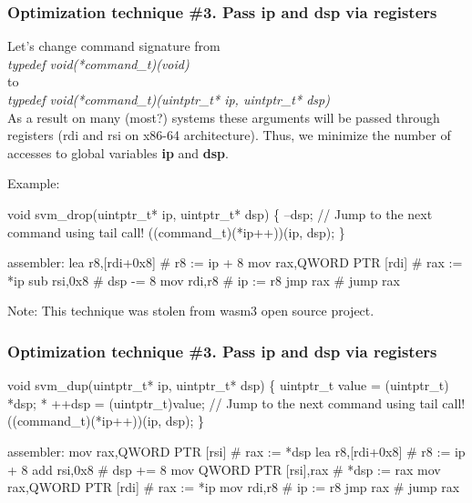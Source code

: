 \documentclass[hyperref={colorlinks=true},xcolor=table]{beamer}
\begin{document}
\tiny
\begin{frame}[fragile]
  \frametitle{Optimization technique \#3. Pass ip and dsp via
    registers}
  Let's change command signature from\\
  \textit{typedef void(*command\_t)(void)}\\
  to\\
  \textit{typedef void(*command\_t)(uintptr\_t* ip, uintptr\_t* dsp)}\\
  As a result on many (most?) systems these arguments will be passed
  through registers (rdi and rsi on x86-64 architecture). Thus, we
  minimize the number of accesses to global variables \textbf{ip} and \textbf{dsp}.

  Example:
  \begin{CodeNoLabel}
void svm_drop(uintptr_t* ip, uintptr_t* dsp) \{
    --dsp;
    // Jump to the next command using tail call!
    ((command_t)(*ip++))(ip, dsp);
\}

assembler:
    lea    r8,[rdi+0x8]           # r8  := ip + 8
    mov    rax,QWORD PTR [rdi]    # rax := *ip
    sub    rsi,0x8                # dsp -= 8
    mov    rdi,r8                 # ip  := r8
    jmp    rax                    # jump rax

  \end{CodeNoLabel}

  Note: This technique was stolen from wasm3 open source project.
\end{frame}
\normalsize

\begin{frame}[fragile]
  \frametitle{Optimization technique \#3. Pass ip and dsp via
    registers}
  \begin{CodeNoLabel}
void svm_dup(uintptr_t* ip, uintptr_t* dsp) \{
    uintptr_t value = (uintptr_t) *dsp;
    * ++dsp = (uintptr_t)value;
    // Jump to the next command using tail call!
    ((command_t)(*ip++))(ip, dsp);
\}

assembler:
   mov    rax,QWORD PTR [rsi]     # rax  := *dsp
   lea    r8,[rdi+0x8]            # r8   := ip + 8
   add    rsi,0x8                 # dsp  += 8
   mov    QWORD PTR [rsi],rax     # *dsp := rax
   mov    rax,QWORD PTR [rdi]     # rax  := *ip
   mov    rdi,r8                  # ip   := r8
   jmp    rax                     # jump rax
  \end{CodeNoLabel}
\end{frame}
\end{document}
